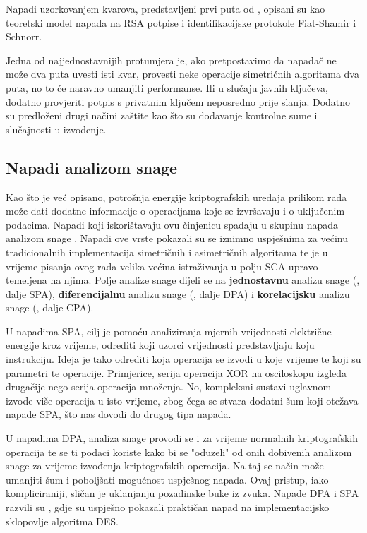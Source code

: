 \documentclass[times, utf8, diplomski]{fer}
\begin{document}
Napadi uzorkovanjem kvarova, predstavljeni prvi puta od \cite{boneh1997importance}, opisani su kao teoretski model napada na RSA potpise i identifikacijske protokole Fiat-Shamir i Schnorr.

Jedna od najjednostavnijih protumjera je, ako pretpostavimo da napadač ne može dva puta uvesti isti kvar, provesti neke operacije simetričnih algoritama dva puta, no to će naravno umanjiti performanse. Ili u slučaju javnih ključeva, dodatno provjeriti potpis s privatnim ključem neposredno prije slanja. Dodatno su predloženi drugi načini zaštite kao što su dodavanje kontrolne sume i slučajnosti u izvođenje.

\subsection{Napadi analizom snage}

Kao što je već opisano, potrošnja energije kriptografskih uređaja prilikom rada može dati dodatne informacije o operacijama koje se izvršavaju i o uključenim podacima. Napadi koji iskorištavaju ovu činjenicu spadaju u skupinu napada analizom snage . Napadi ove vrste pokazali su se iznimno uspješnima za većinu tradicionalnih implementacija simetričnih i asimetričnih algoritama te je u vrijeme pisanja ovog rada velika većina istraživanja u polju SCA upravo temeljena na njima. Polje analize snage dijeli se na \textbf{jednostavnu} analizu snage (, dalje SPA), \textbf{diferencijalnu} analizu snage (, dalje DPA) i \textbf{korelacijsku} analizu snage (, dalje CPA).

U napadima SPA, cilj je pomoću analiziranja mjernih vrijednosti električne energije kroz vrijeme, odrediti koji uzorci vrijednosti predstavljaju koju instrukciju. Ideja je tako odrediti koja operacija se izvodi u koje vrijeme te koji su parametri te operacije. Primjerice, serija operacija XOR na osciloskopu izgleda drugačije nego serija operacija množenja. No, kompleksni sustavi uglavnom izvode više operacija u isto vrijeme, zbog čega se stvara dodatni šum koji otežava napade SPA, što nas dovodi do drugog tipa napada.

U napadima DPA, analiza snage provodi se i za vrijeme normalnih kriptografskih operacija te se ti podaci koriste kako bi se "oduzeli"
od onih dobivenih analizom snage za vrijeme izvođenja kriptografskih operacija. Na taj se način može umanjiti šum i poboljšati mogućnost uspješnog napada. Ovaj pristup, iako kompliciraniji, sličan je uklanjanju pozadinske buke iz zvuka. Napade DPA i SPA razvili su \cite{kocher1999differential}, gdje su uspješno pokazali praktičan napad na implementacijsko sklopovlje algoritma DES.
\end{document}
